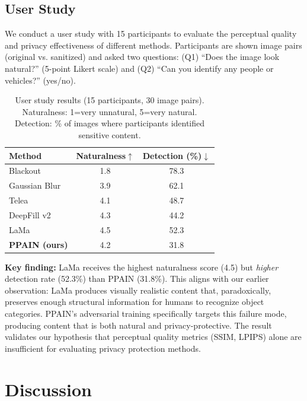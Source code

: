 \documentclass[preprint,12pt]{elsarticle}
\begin{document}
\subsection{User Study}

We conduct a user study with 15 participants to evaluate the perceptual quality and privacy effectiveness of different methods. Participants are shown image pairs (original vs. sanitized) and asked two questions: (Q1) ``Does the image look natural?'' (5-point Likert scale) and (Q2) ``Can you identify any people or vehicles?'' (yes/no).

\begin{table}[t]
\centering
\caption{User study results (15 participants, 30 image pairs). Naturalness: 1=very unnatural, 5=very natural. Detection: \% of images where participants identified sensitive content.}
\label{tab:user}
\begin{tabular}{lcc}
\toprule
\textbf{Method} & \textbf{Naturalness}$\uparrow$ & \textbf{Detection (\%)}$\downarrow$ \\
\midrule
Blackout & 1.8 & 78.3 \\
Gaussian Blur & 3.9 & 62.1 \\
Telea & 4.1 & 48.7 \\
DeepFill v2 & 4.3 & 44.2 \\
LaMa & 4.5 & 52.3 \\
\midrule
\textbf{PPAIN (ours)} & 4.2 & 31.8 \\
\bottomrule
\end{tabular}
\end{table}

\textbf{Key finding:} LaMa receives the highest naturalness score (4.5) but \emph{higher} detection rate (52.3\%) than PPAIN (31.8\%). This aligns with our earlier observation: LaMa produces visually realistic content that, paradoxically, preserves enough structural information for humans to recognize object categories. PPAIN's adversarial training specifically targets this failure mode, producing content that is both natural and privacy-protective. The result validates our hypothesis that perceptual quality metrics (SSIM, LPIPS) alone are insufficient for evaluating privacy protection methods.


\section{Discussion}
\label{sec:discussion}
\end{document}
